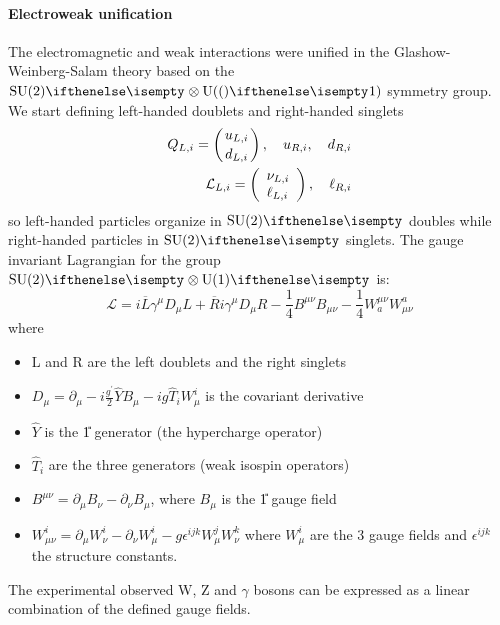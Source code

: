 \paragraph*{Electroweak unification}\label{sub:EW}
The electromagnetic and weak interactions were unified in the Glashow-Weinberg-Salam theory \cite{Weinberg1967ALeptons,Salam1964ElectromagneticInteractions,Glashow1961PartialInteractions} based on the $\SU{2} \otimes \U(1)$ symmetry group.\\
We start defining left-handed doublets and right-handed singlets
\begin{align}
    Q_{L,i}=\left({u_{L,i}}\atop{d_{L,i}}\right), \quad u_{R,i},\quad d_{R,i} \\
    \mathcal{L}_{L,i}=\left(\begin{array}{l}{{\nu_{L,i}}}\\ {{\ell_{L,i}}}\end{array}\right),\quad\ell_{R,i}
\end{align}
so left-handed particles organize in $\SU{2}$ doubles while right-handed particles in $\SU{2}$ singlets.
The gauge invariant Lagrangian for the group $\SU{2}\otimes\U{1}$ is:
\begin{equation}\label{eq:EWK_preunification}
{\mathcal{L}}=i\overline{{{L}}}\gamma^{\mu}D_{\mu}L+\overline{{{R}}}i\gamma^{\mu}D_{\mu}R-\frac{1}{4}B^{\mu\nu}B_{\mu\nu}-\frac{1}{4}W_{a}^{\mu\nu}W_{\mu\nu}^{a}
\end{equation}
where
\begin{itemize}
    \item L and R are the left doublets and the right singlets
    \item $D_{\mu}=\partial_{\mu}-i{\frac{g^{\prime}}{2}}\hat{Y}B_{\mu}-i g\hat{T}_{i}W_{\mu}^{i}$ is the covariant derivative
    \item $\hat{Y}$ is the \U{1} generator (the hypercharge operator)
    \item $\hat{T}_i$ are the three  generators (weak isospin operators)
    \item $B^{\mu\nu}=\partial_{\mu}B_{\nu}-\partial_{\nu}B_{\mu}$, where $B_\mu$ is the \U{1} gauge field
    \item $W_{\mu\nu}^{i}=\partial_{\mu}W_{\nu}^{i}-\partial_{\nu}W_{\mu}^{i}-g\epsilon^{i j k}W_{\mu}^{j}W_{\nu}^{k}$ where $W^i_\mu$ are the 3  gauge fields and $\epsilon^{ijk}$ the  structure constants. 
\end{itemize}
The experimental observed W, Z and $\gamma$ bosons can be expressed as a linear combination of the defined gauge fields.
